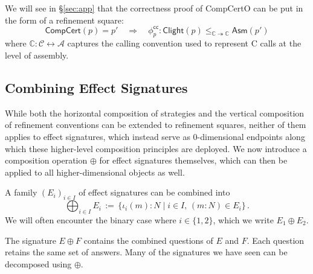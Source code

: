 \documentclass[acmsmall,screen,review,anonymous,nonacm]{acmart}
\newcommand{\kw}[1]{\ensuremath{ \mathsf{#1} }}
\begin{document}
\begin{example} %
\label{ex:bq-proof}
We will see in \S\ref{sec:app}
that the correctness proof of CompCertO
can be put in the form of a refinement square:
\[
  \kw{CompCert}(p) = p'
  \quad \Longrightarrow \quad
    \phi^\kw{cc}_p :
      \kw{Clight}(p) \le_{\mathbb{C} \twoheadrightarrow \mathbb{C}} \kw{Asm}(p')
\]
where %
$\mathbb{C} : \mathcal{C} \leftrightarrow \mathcal{A}$
captures the calling convention used %
to represent C calls at the level of assembly.
\end{example}



\subsection{Combining Effect Signatures} \label{sec:fcomp} %

While
both the horizontal composition of strategies
and the vertical composition of refinement conventions
can be extended to refinement squares,
neither of them applies to effect signatures,
which instead serve as 0-dimensional endpoints along which
these higher-level composition principles are deployed.
We now introduce
a composition operation $\oplus$ for effect signatures themselves,
which can then be applied to all higher-dimensional objects as well.

\begin{definition}
A family $(E_i)_{i \in I}$ of effect signatures can be combined into
\[
  \bigoplus_{i \in I} E_i \, := \,
    \{ \iota_i(m) \mathbin: N \mid i \in I,\, (m \mathbin: N) \in E_i \}
  \,.
\]
We will often encounter the binary case where $i \in \{1, 2\}$,
which we write $E_1 \oplus E_2$.
\end{definition}

The signature $E \oplus F$ contains the combined questions of $E$ and $F$.
Each question retains the same set of answers.
Many of the signatures we have seen can be decomposed using $\oplus$.
\end{document}
